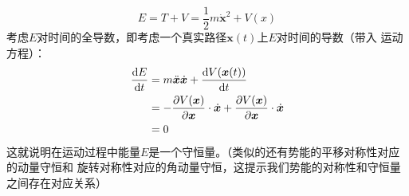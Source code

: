     \begin{equation}
        E = T + V = \frac{1}{2}m\dot{\bm{x}}^2 + V(x)
    \end{equation}
    考虑$E$对时间的全导数，即考虑一个真实路径$\bm{x}(t)$上$E$对时间的导数（带入
    运动方程）：
    \begin{equation}
        \begin{split}
            \frac{\mathrm{d}{E}}{\mathrm{d}{t}} & = m\ddot{\bm{x}}\dot{\bm{x}} + \frac{\mathrm{d}{V(\bm{x}(t))}}{\mathrm{d}{t}}\\
            & = - \frac{\partial{V(\bm{x})}}{\partial{\bm{x}}} \cdot \dot{\bm{x}} + \frac{\partial{V(\bm{x})}}{\partial{\bm{x}}}
            \cdot \dot{\bm{x}}\\
            & = 0
        \end{split}
    \end{equation}
    这就说明在运动过程中能量$E$是一个守恒量。（类似的还有势能的平移对称性对应的动量守恒和
    旋转对称性对应的角动量守恒，这提示我们势能的对称性和守恒量之间存在对应关系）
